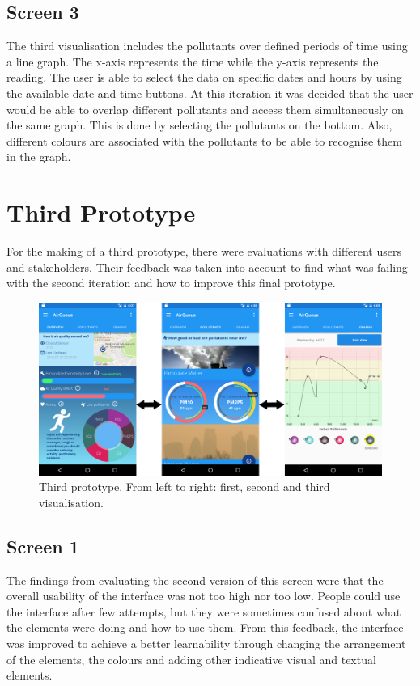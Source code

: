 \subsection{Screen 3}
The third visualisation includes the pollutants over defined periods of time using a line graph. The x-axis represents the time while the y-axis represents the reading. The user is able to select the data on specific dates and hours by using the available date and time buttons. At this iteration it was decided that the user would be able to overlap different pollutants and access them simultaneously on the same graph. This is done by selecting the pollutants on the bottom. Also, different colours are associated with the pollutants to be able to recognise them in the graph.

\section{Third Prototype}
For the making of a third prototype, there were evaluations with different users and stakeholders. Their feedback was taken into account to find what was failing with the second iteration and how to improve this final prototype. 

\begin{figure}[H]
\begin{adjustbox}{width=1.2\textwidth,center=\textwidth}
  \centering
  \includegraphics[scale=1]{images/thirdPrototype.png}
\end{adjustbox}
  \caption[Third prototype]{Third prototype. From left to right: first, second and third visualisation.}
  \label{fig:third_prototype}
\end{figure}

\subsection{Screen 1}
The findings from evaluating the second version of this screen were that the overall usability of the interface was not too high nor too low. People could use the interface after few attempts, but they were sometimes confused about what the elements were doing and how to use them. From this feedback, the interface was improved to achieve a better learnability through changing the arrangement of the elements, the colours and adding other indicative visual and textual elements.

